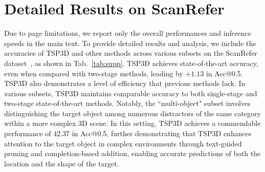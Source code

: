 
\section{Detailed Results on ScanRefer}\label{sec:supp3}
Due to page limitations, we report only the overall performances and inference speeds in the main text. To provide detailed results and analysis, we include the accuracies of TSP3D and other methods across various subsets on the ScanRefer dataset~\citep{chen2020scanrefer}, as shown in Tab.~\ref{tab:supp}. TSP3D achieves state-of-the-art accuracy, even when compared with two-stage methods, leading by $+1.13$ in Acc@0.5. TSP3D also demonstrates a level of efficiency that previous methods lack. In various subsets, TSP3D maintains comparable accuracy to both single-stage and two-stage state-of-the-art methods.
Notably, the ``multi-object" subset involves distinguishing the target object among numerous distractors of the same category within a more complex 3D scene. In this setting, TSP3D achieves a commendable performance of \(42.37\) in Acc@0.5, further demonstrating that TSP3D enhances attention to the target object in complex environments through text-guided pruning and completion-based addition, enabling accurate predictions of both the location and the shape of the target.


